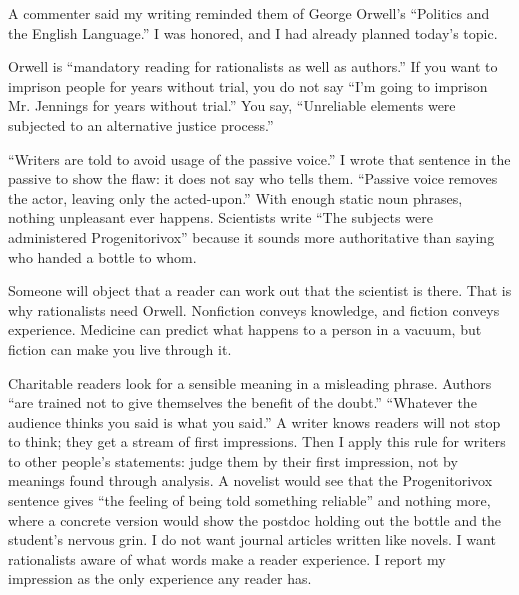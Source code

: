 
A commenter said my writing reminded them of George Orwell's ``Politics and the English Language.'' I was honored, and I had already planned today's topic.

Orwell is ``mandatory reading for rationalists as well as authors.'' If you want to imprison people for years without trial, you do not say ``I'm going to imprison Mr. Jennings for years without trial.'' You say, ``Unreliable elements were subjected to an alternative justice process.'' 

``Writers are told to avoid usage of the passive voice.'' I wrote that sentence in the passive to show the flaw: it does not say who tells them.  ``Passive voice removes the actor, leaving only the acted-upon.'' With enough static noun phrases, nothing unpleasant ever happens.  Scientists write ``The subjects were administered Progenitorivox'' because it sounds more authoritative than saying who handed a bottle to whom. 

Someone will object that a reader can work out that the scientist is there. That is why rationalists need Orwell. Nonfiction conveys knowledge, and fiction conveys experience. Medicine can predict what happens to a person in a vacuum, but fiction can make you live through it.

Charitable readers look for a sensible meaning in a misleading phrase. Authors ``are trained not to give themselves the benefit of the doubt.''  ``Whatever the audience thinks you said is what you said.'' A writer knows readers will not stop to think; they get a stream of first impressions. Then I apply this rule for writers to other people's statements: judge them by their first impression, not by meanings found through analysis. A novelist would see that the Progenitorivox sentence gives ``the feeling of being told something reliable'' and nothing more, where a concrete version would show the postdoc holding out the bottle and the student's nervous grin. I do not want journal articles written like novels. I want rationalists aware of what words make a reader experience. I report my impression as the only experience any reader has.

